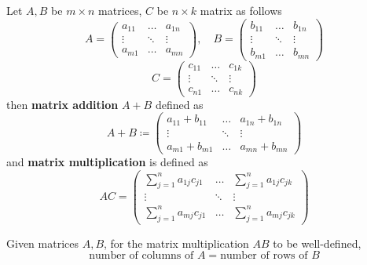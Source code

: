 \documentclass[openany]{book}
\begin{document}
\begin{defn}
    Let $A, B$ be $m\times n$ matrices, $C$ be $n\times k$ matrix as follows 
    \begin{equation*}
        A=\begin{pmatrix}
            a_{11}&\dots& a_{1n}\\
            \vdots&\ddots&\vdots\\
            a_{m1}&\dots&a_{mn}
        \end{pmatrix}, \quad B=\begin{pmatrix}
            b_{11}&\dots&b_{1n}\\
            \vdots&\ddots&\vdots\\
            b_{m1}&\dots&b_{mn}
        \end{pmatrix}
    \end{equation*}
    \begin{equation*}
        C=\begin{pmatrix}
            c_{11}&\dots&c_{1k}\\
            \vdots&\ddots&\vdots\\
            c_{n1}&\dots&c_{nk}
        \end{pmatrix}
    \end{equation*}
    then \textbf{matrix addition} $A+B$ defined as 
    \begin{equation*}
        A+B\coloneq\begin{pmatrix}
            a_{11}+b_{11}&\dots& a_{1n}+b_{1n}\\
            \vdots&\ddots&\vdots\\
            a_{m1}+b_{m1}&\dots&a_{mn}+b_{mn}
        \end{pmatrix}
    \end{equation*}
    and \textbf{matrix multiplication} is defined as 
    \begin{equation*}
        AC=\begin{pmatrix}
            \sum_{j=1}^na_{1j}c_{j1}&\dots&\sum_{j=1}^na_{1j}c_{jk}\\
            \vdots&\ddots&\vdots\\
            \sum_{j=1}^na_{mj}c_{j1}&\dots&\sum_{j=1}^na_{mj}c_{jk}
        \end{pmatrix}
    \end{equation*}
    \begin{remark}
        Given matrices $A,B$, for the matrix multiplication $AB$ to be well-defined,
        \begin{equation*}
            \text{number of columns of $A$}=\text{number of rows of $B$}
        \end{equation*}
    \end{remark}
\end{defn}
\end{document}
